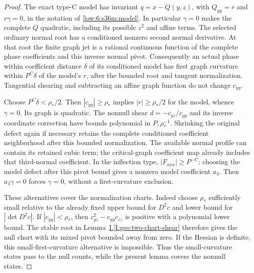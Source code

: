 \documentclass[11pt]{amsart}
\theoremstyle{definition}
\theoremstyle{remark}
\numberwithin{equation}{section}
\newcommand{\partIref}[1]{\hyperref[I:#1]{I.\ref*{I:#1}}}
\begin{document}
\begin{proof}
The exact type-C model has invariant $q=x-Q(y,z)$, with $Q_{yy}=r$ and $r\gamma=0$, in the notation of \eqref{low:6:s36m:model}. In particular $\gamma=0$ makes the complete $Q$ quadratic, including its possible $z^2$ and affine terms. The selected ordinary normal root has a conditioned nonzero second normal derivative. At that root the finite graph jet is a rational continuous function of the complete phase coefficients and this inverse normal pivot. Consequently an actual phase within coefficient distance $\delta$ of its conditioned model has first graph curvature within $P^C\delta$ of the model's $r$, after the bounded root and tangent normalization. Tangential shearing and subtracting an affine graph function do not change $c_{yy}$.

Choose $P^C\delta<\rho_*/2$. Then $|c_{yy}|\ge\rho_*$ implies $|r|\ge\rho_*/2$ for the model, whence $\gamma=0$. Its graph is quadratic. The nonnull shear $d=-c_{yz}/c_{yy}$ and its inverse coordinate correction have bounds polynomial in $P,\rho_*^{-1}$. Shrinking the original defect again if necessary retains the complete conditioned coefficient neighborhood after this bounded normalization. The available normal profile can contain its retained cubic term; the critical-graph coefficient map already includes that third-normal coefficient. In the inflection type, $|F_{xxx}|\ge P^{-C}$; choosing the model defect after this pivot bound gives a nonzero model coefficient $a_3$. Then $a_3\gamma=0$ forces $\gamma=0$, without a first-curvature exclusion.

These alternatives cover the normalization charts. Indeed choose $\rho_*$ sufficiently small relative to the already fixed upper bound for $D^2c$ and lower bound for $|\det D^2c|$. If $|c_{yy}|<\rho_*$, then $c_{yz}^2-c_{yy}c_{zz}$ is positive with a polynomial lower bound. The stable root in Lemma~\partIref{geo:two-chart-shear} therefore gives the null chart with its mixed pivot bounded away from zero. If the Hessian is definite, this small-first-curvature alternative is impossible. Thus the small-curvature states pass to the null counts, while the present lemma covers the nonnull states.
\end{proof}
\end{document}
